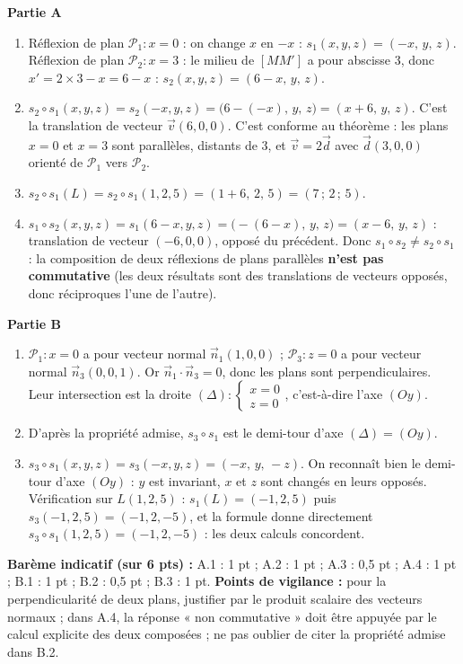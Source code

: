 \documentclass[11pt]{article}
\newcommand{\cle}[1]{{\popxbold\color{popdark}#1}}
\begin{document}
\begin{corrige}
\textbf{Partie A}
\begin{enumerate}
\item Réflexion de plan $\mathcal{P}_1:x=0$ : on change $x$ en $-x$ : $s_1(x,y,z)=(-x,\,y,\,z)$.
Réflexion de plan $\mathcal{P}_2:x=3$ : le milieu de $[MM']$ a pour abscisse $3$, donc $x'=2\times 3-x=6-x$ : $s_2(x,y,z)=(6-x,\,y,\,z)$.
\item $s_2\circ s_1(x,y,z)=s_2(-x,y,z)=\bigl(6-(-x),\,y,\,z\bigr)=(x+6,\,y,\,z)$.
C'est la \cle{translation} de vecteur $\vec{v}(6,0,0)$. C'est conforme au théorème : les plans $x=0$ et $x=3$ sont parallèles, distants de $3$, et $\vec{v}=2\vec{d}$ avec $\vec{d}(3,0,0)$ orienté de $\mathcal{P}_1$ vers $\mathcal{P}_2$.
\item $s_2\circ s_1(L)=s_2\circ s_1(1,2,5)=(1+6,\,2,\,5)=(7\,;\,2\,;\,5)$.
\item $s_1\circ s_2(x,y,z)=s_1(6-x,y,z)=\bigl(-(6-x),\,y,\,z\bigr)=(x-6,\,y,\,z)$ : translation de vecteur $(-6,0,0)$, opposé du précédent. Donc $s_1\circ s_2\neq s_2\circ s_1$ : la composition de deux réflexions de plans parallèles \textbf{n'est pas commutative} (les deux résultats sont des translations de vecteurs opposés, donc réciproques l'une de l'autre).
\end{enumerate}
\textbf{Partie B}
\begin{enumerate}
\item $\mathcal{P}_1:x=0$ a pour vecteur normal $\vec{n}_1(1,0,0)$ ; $\mathcal{P}_3:z=0$ a pour vecteur normal $\vec{n}_3(0,0,1)$. Or $\vec{n}_1\cdot\vec{n}_3=0$, donc les plans sont \cle{perpendiculaires}. Leur intersection est la droite $(\Delta):\begin{cases} x=0 \\ z=0 \end{cases}$, c'est-à-dire l'axe $(Oy)$.
\item D'après la propriété admise, $s_3\circ s_1$ est le \cle{demi-tour} d'axe $(\Delta)=(Oy)$.
\item $s_3\circ s_1(x,y,z)=s_3(-x,y,z)=(-x,\,y,\,-z)$. On reconnaît bien le demi-tour d'axe $(Oy)$ : $y$ est invariant, $x$ et $z$ sont changés en leurs opposés. Vérification sur $L(1,2,5)$ : $s_1(L)=(-1,2,5)$ puis $s_3(-1,2,5)=(-1,2,-5)$, et la formule donne directement $s_3\circ s_1(1,2,5)=(-1,2,-5)$ : les deux calculs concordent.
\end{enumerate}
\textbf{Barème indicatif (sur 6 pts) :} A.1 : 1 pt ; A.2 : 1 pt ; A.3 : 0,5 pt ; A.4 : 1 pt ; B.1 : 1 pt ; B.2 : 0,5 pt ; B.3 : 1 pt.
\textbf{Points de vigilance :} pour la perpendicularité de deux plans, justifier par le produit scalaire des vecteurs normaux ; dans A.4, la réponse « non commutative » doit être appuyée par le calcul explicite des deux composées ; ne pas oublier de citer la propriété admise dans B.2.
\end{corrige}
\end{document}

